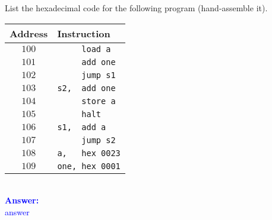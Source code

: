 \item{}
List the hexadecimal code for the following program (hand-assemble it).\\[6pt]
\begin{tabular}{c|l}
    {\bf Address} & {\bf Instruction} \\ \hline
$100$ & {\tt\ \ \ \ \ load a}\\
$101$ & {\tt\ \ \ \ \ add one}\\
$102$ & {\tt\ \ \ \ \ jump s1}\\
$103$ & {\tt s2,\ \ add one}\\
$104$ & {\tt\ \ \ \ \ store a}\\
$105$ & {\tt\ \ \ \ \ halt}\\
$106$ & {\tt s1,\ \ add a}\\
$107$ & {\tt\ \ \ \ \ jump s2}\\
$108$ & {\tt a,\ \ \ hex 0023}\\
$109$ & {\tt one,\ hex 0001}\\
\end{tabular}
\\[12pt]
\ifanswers
\textcolor{blue}{
\textbf{Answer:}\\
answer
}
\newpage
\fi

